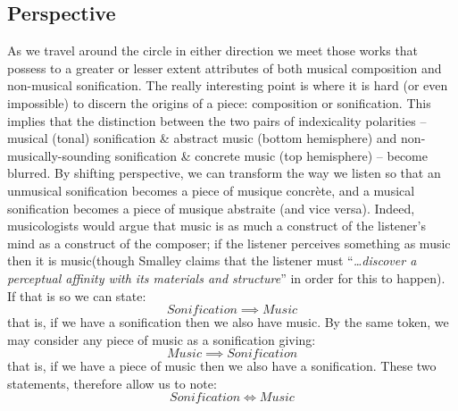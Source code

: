 \documentclass{article}
\begin{document}
\subsection{Perspective}\label{perspective}
As we travel around the circle in either direction we meet those works that possess to a greater or lesser extent attributes of both musical composition and non-musical sonification. The really interesting point is where it is hard (or even impossible) to discern the origins of a piece: composition or sonification. This implies that the distinction between the two pairs of indexicality polarities -- musical (tonal) sonification \& abstract music (bottom hemisphere) and non-musically-sounding sonification \& concrete music (top hemisphere) -- become blurred. By shifting perspective, we can transform the way we listen so that an unmusical sonification becomes a piece of musique concrète, and a musical sonification becomes a piece of musique abstraite (and vice versa). Indeed, musicologists would argue that music is as much a construct of the listener’s mind as a construct of the composer; if the listener perceives something as music then it is music(though Smalley \cite{Smalley:1986} claims that the listener must  ``\textit{…discover a perceptual affinity with its materials and structure}'' in order for this to happen). If that is so we can state:
\begin{equation} 
Sonification \implies Music
\label{eq2} 
\end{equation}
that is, if we have a sonification then we also have music. By the same token, we may consider any piece of music as a sonification giving:
\begin{equation} 
Music \implies Sonification
\label{eq3} 
\end{equation}
that is, if we have a piece of music then we also have a sonification. These two statements, therefore allow us to note:
\begin{equation} 
Sonification \iff Music
\label{eq4} 
\end{equation}
\end{document}
